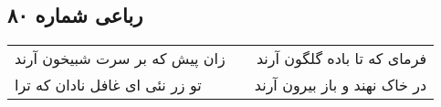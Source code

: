 \begin{center}
\section*{رباعی شماره ۸۰}
\label{sec:sh080}
\begin{longtable}{l p{0.5cm} r}
زان پیش که بر سرت شبیخون آرند
&&
فرمای که تا باده گلگون آرند
\\
تو زر نئی ای غافل نادان که ترا
&&
در خاک نهند و باز بیرون آرند
\\
\end{longtable}
\end{center}
